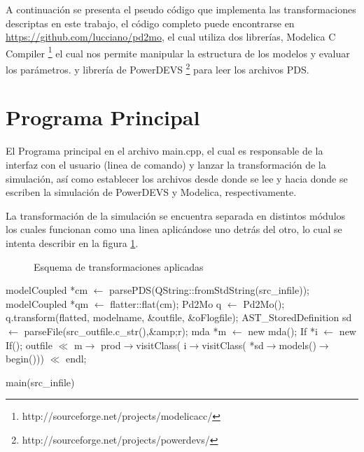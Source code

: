	A continuación se presenta el pseudo código que implementa las transformaciones descriptas en este trabajo, 
	el código completo puede encontrarse en \url{https://github.com/lucciano/pd2mo}, el cual utiliza dos librerías, Modelica C Compiler 
	\footnote{http://sourceforge.net/projects/modelicacc/} el cual nos permite manipular la estructura de los modelos y evaluar los parámetros.
	y librería de PowerDEVS \footnote{http://sourceforge.net/projects/powerdevs/} para leer los archivos PDS.


\section{Programa Principal}

El Programa principal en el archivo main.cpp, el cual es responsable de la interfaz con el usuario (linea de comando) y lanzar la transformación de la simulación, así como establecer los archivos desde donde se lee y hacia donde se escriben la simulación de PowerDEVS y Modelica, respectivamente.

La transformación de la simulación se encuentra separada en distintos módulos los cuales funcionan como una linea aplicándose uno detrás del otro, lo cual se intenta
describir en la figura \ref{fig:pipeline}.
\begin{figure}[H]
\centerfloat
{}
\caption{Esquema de transformaciones aplicadas}
\label{fig:pipeline}
\end{figure}


\begin{algorithm}[H]
\begin{algorithmic}[1]
\State modelCoupled *cm $\gets$ parsePDS(QString::fromStdString(src\_infile));
\State modelCoupled *qm $\gets$ flatter::flat(cm);
\State Pd2Mo q $\gets$ Pd2Mo();
\State q.transform(flatted, modelname, \&outfile, \&oFlogfile);
\State AST\_StoredDefinition sd $\gets$ parseFile(src\_outfile.c\_str(),\&amp;r);
\State mda *m $\gets$ new mda();
\State If *i $\gets$ new If();
\State outfile $\ll$ m$\rightarrow$ 
		{prod$\rightarrow$visitClass( i$\rightarrow$visitClass( 
			*sd$\rightarrow$models()$\rightarrow$begin()))} $\ll$ endl;

\end{algorithmic}
\caption{main(src\_infile)}
\end{algorithm}

